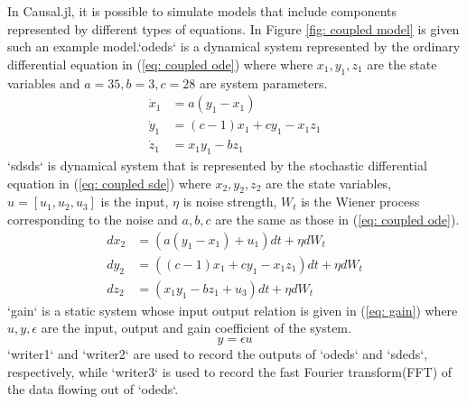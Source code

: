 In Causal.jl, it is possible to simulate models that include components represented by different types of equations. In Figure \ref{fig: coupled model} is given such an example model.`odeds` is a dynamical system represented by the ordinary differential equation in (\ref{eq: coupled ode}) where where $x_1, y_1, z_1$ are the state variables and $a=35, b=3, c = 28$ are system parameters.
\begin{equation}
    \begin{split}
        \dot{x}_1 &= a (y_1 - x_1) \\
        \dot{y}_1 &= (c - 1) x_1 + c y_1 - x_1 z_1 \\
        \dot{z}_1 &= x_1 y_1 - b z_1
    \end{split}
    \label{eq: coupled ode}
\end{equation}
`sdsds` is dynamical system that is represented by the stochastic differential equation in (\ref{eq: coupled sde}) where $x_2, y_2, z_2$ are the state variables, $u=[u_1,u_2, u_3]$ is the input, $\eta$ is noise strength, $W_t$ is the Wiener process corresponding to the noise and $a, b, c$ are the same as those in (\ref{eq: coupled ode}).
\begin{equation}
    \begin{split}
        dx_2 &= (a (y_1 - x_1) + u_1) dt + \eta dW_t \\
        dy_2 &= ((c - 1) x_1 + c y_1 - x_1 z_1)dt + \eta dW_t \\
        dz_2 &= (x_1 y_1 - b z_1 + u_3) dt + \eta dW_t 
    \end{split}
    \label{eq: coupled sde}
\end{equation}
`gain` is a static system whose input output relation is given in (\ref{eq: gain}) where $u, y, \epsilon$ are the input, output and gain coefficient of the system. 
\begin{equation}
    y = \epsilon u
    \label{eq: gain}
\end{equation}
`writer1` and `writer2` are used to record the outputs of `odeds` and `sdeds`, respectively, while `writer3` is used to record the fast Fourier transform(FFT) of the data flowing out of `odeds`\cite{proakis2004digital}. 

